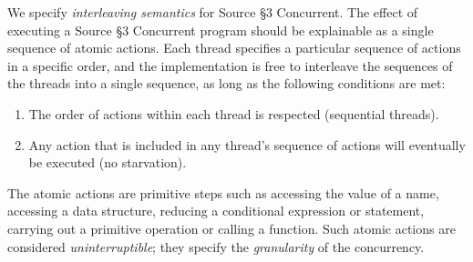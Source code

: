We specify \emph{interleaving semantics} for Source \S 3 Concurrent.
The effect of executing a Source \S 3 Concurrent program
should be explainable as a single sequence of atomic actions. Each thread
specifies a particular sequence of actions in a specific order,
and the implementation is free to interleave the sequences of the threads
into a single sequence, as long as the following conditions are met:
\begin{enumerate}
\item The order of actions within each thread is respected (sequential
  threads).
\item Any action that is included in any thread's sequence of actions will
  eventually be executed (no starvation).
\end{enumerate}
\noindent
The atomic actions are primitive steps such as accessing the value of a name,
accessing a data structure, reducing a conditional expression or statement,
carrying out a primitive operation or calling a function. Such atomic actions
are considered \emph{uninterruptible}; they specify the \emph{granularity}
of the concurrency.



\newpage



\newpage





































\newpage



\newpage



    

